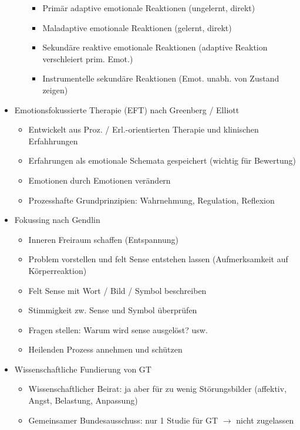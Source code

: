 \documentclass[11pt, paper=a4, twocolumn]{scrartcl}
\begin{document}
\begin{itemize}
\begin{itemize}
\begin{itemize}
							\item Primär adaptive emotionale Reaktionen (ungelernt, direkt)
							\item Maladaptive emotionale Reaktionen (gelernt, direkt)
							\item Sekundäre reaktive emotionale Reaktionen (adaptive Reaktion verschleiert prim. Emot.)
							\item Instrumentelle sekundäre Reaktionen (Emot. unabh. von Zustand zeigen)
						\end{itemize}
				\end{itemize}
			\item Emotionsfokussierte Therapie (EFT) nach Greenberg / Elliott
				\begin{itemize}
					\item Entwickelt aus Proz. / Erl.-orientierten Therapie und klinischen Erfahhrungen
					\item Erfahrungen als emotionale Schemata gespeichert (wichtig für Bewertung)
					\item Emotionen durch Emotionen verändern
					\item Prozesshafte Grundprinzipien: Wahrnehmung, Regulation, Reflexion
				\end{itemize}
			\item Fokussing nach Gendlin
				\begin{itemize}
					\item Inneren Freiraum schaffen (Entspannung)
					\item Problem vorstellen und felt Sense entstehen lassen (Aufmerksamkeit auf Körperreaktion)
					\item Felt Sense mit Wort / Bild / Symbol beschreiben
					\item Stimmigkeit zw. Sense und Symbol überprüfen
					\item Fragen stellen: Warum wird sense ausgelöst? usw.
					\item Heilenden Prozess annehmen und schützen
				\end{itemize}
			\item Wissenschaftliche Fundierung von GT
				\begin{itemize}
					\item Wissenschaftlicher Beirat: ja aber für zu wenig Störungsbilder (affektiv, Angst, Belastung, Anpassung)
					\item Gemeinsamer Bundesausschuss: nur 1 Studie für GT $\rightarrow$ nicht zugelassen
				\end{itemize}
		\end{itemize}
\end{document}
